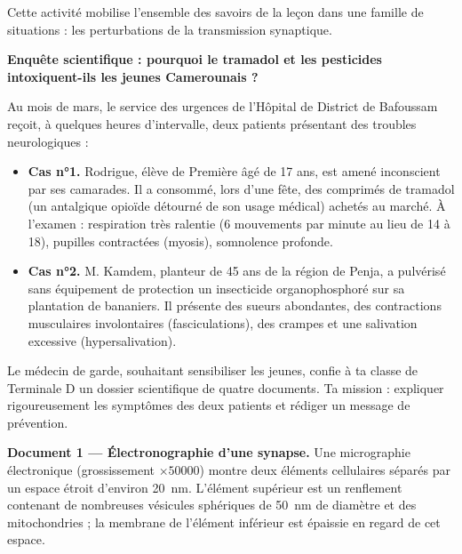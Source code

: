 \documentclass[11pt]{article}
\newcommand{\cle}[1]{{\popxbold\color{popdark}#1}}
\newcounter{popsec}
\newcounter{popsub}
\newcommand{\courssub}[1]{%
  \stepcounter{popsub}%
  \par\vspace{9pt}\noindent{\popxbold\fontsize{11.5}{13}\selectfont\color{popink}{\color{poporange}\thepopsec.\thepopsub}\hspace{6pt}#1}\par\nopagebreak\vspace{4pt}
}
\begin{document}
Cette activité mobilise l'ensemble des savoirs de la leçon dans une \cle{famille de situations} : les perturbations de la transmission synaptique.

\courssub{Situation}

\textbf{Enquête scientifique : pourquoi le tramadol et les pesticides intoxiquent-ils les jeunes Camerounais ?}

\medskip

Au mois de mars, le service des urgences de l'Hôpital de District de Bafoussam reçoit, à quelques heures d'intervalle, deux patients présentant des troubles neurologiques :

\begin{itemize}
\item \textbf{Cas n°1.} Rodrigue, élève de Première âgé de 17 ans, est amené inconscient par ses camarades. Il a consommé, lors d'une fête, des comprimés de \cle{tramadol} (un antalgique opioïde détourné de son usage médical) achetés au marché. À l'examen : respiration très ralentie (6 mouvements par minute au lieu de 14 à 18), pupilles contractées (myosis), somnolence profonde.
\item \textbf{Cas n°2.} M. Kamdem, planteur de 45 ans de la région de Penja, a pulvérisé sans équipement de protection un insecticide \cle{organophosphoré} sur sa plantation de bananiers. Il présente des sueurs abondantes, des contractions musculaires involontaires (fasciculations), des crampes et une salivation excessive (hypersalivation).
\end{itemize}

Le médecin de garde, souhaitant sensibiliser les jeunes, confie à ta classe de Terminale D un dossier scientifique de quatre documents. Ta mission : expliquer rigoureusement les symptômes des deux patients et rédiger un message de prévention.

\medskip

\textbf{Document 1 — Électronographie d'une synapse.} Une micrographie électronique (grossissement $\times \num{50000}$) montre deux éléments cellulaires séparés par un espace étroit d'environ \SI{20}{nm}. L'élément supérieur est un renflement contenant de nombreuses vésicules sphériques de \SI{50}{nm} de diamètre et des mitochondries ; la membrane de l'élément inférieur est épaissie en regard de cet espace.
\end{document}
